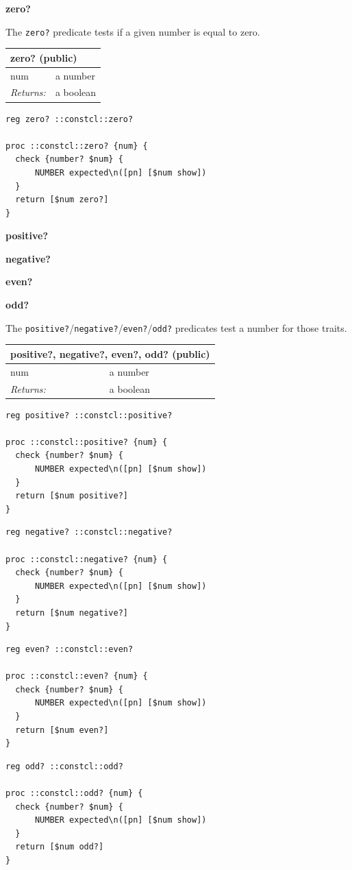 \documentclass[twoside,9pt]{report}
\begin{document}
\textbf{zero?}


The \texttt{zero?} predicate tests if a given number is equal to zero.

\begin{tabular}{ |l l| }
\hline
\multicolumn{2}{|l|}{zero? (public)} \\
\hline
num & a number \\
\textit{Returns:} & a boolean \\
\hline
\end{tabular}

\noindent\makebox[\linewidth]{\rule{\linewidth}{0.4pt}}
\begin{lstlisting}
reg zero? ::constcl::zero?
 
proc ::constcl::zero? {num} {
  check {number? $num} {
      NUMBER expected\n([pn] [$num show])
  }
  return [$num zero?]
}
\end{lstlisting}
\noindent\makebox[\linewidth]{\rule{\linewidth}{0.4pt}}

\textbf{positive?}


\textbf{negative?}


\textbf{even?}


\textbf{odd?}


The \texttt{positive?}/\texttt{negative?}/\texttt{even?}/\texttt{odd?} predicates test a number for those traits.

\begin{tabular}{ |l l| }
\hline
\multicolumn{2}{|l|}{positive?, negative?, even?, odd? (public)} \\
\hline
num & a number \\
\textit{Returns:} & a boolean \\
\hline
\end{tabular}

\noindent\makebox[\linewidth]{\rule{\linewidth}{0.4pt}}
\begin{lstlisting}
reg positive? ::constcl::positive?
 
proc ::constcl::positive? {num} {
  check {number? $num} {
      NUMBER expected\n([pn] [$num show])
  }
  return [$num positive?]
}
\end{lstlisting}
\noindent\makebox[\linewidth]{\rule{\linewidth}{0.4pt}}
\noindent\makebox[\linewidth]{\rule{\linewidth}{0.4pt}}
\begin{lstlisting}
reg negative? ::constcl::negative?
 
proc ::constcl::negative? {num} {
  check {number? $num} {
      NUMBER expected\n([pn] [$num show])
  }
  return [$num negative?]
}
\end{lstlisting}
\noindent\makebox[\linewidth]{\rule{\linewidth}{0.4pt}}
\noindent\makebox[\linewidth]{\rule{\linewidth}{0.4pt}}
\begin{lstlisting}
reg even? ::constcl::even?
 
proc ::constcl::even? {num} {
  check {number? $num} {
      NUMBER expected\n([pn] [$num show])
  }
  return [$num even?]
}
\end{lstlisting}
\noindent\makebox[\linewidth]{\rule{\linewidth}{0.4pt}}
\noindent\makebox[\linewidth]{\rule{\linewidth}{0.4pt}}
\begin{lstlisting}
reg odd? ::constcl::odd?
 
proc ::constcl::odd? {num} {
  check {number? $num} {
      NUMBER expected\n([pn] [$num show])
  }
  return [$num odd?]
}
\end{lstlisting}
\noindent\makebox[\linewidth]{\rule{\linewidth}{0.4pt}}
\end{document}
